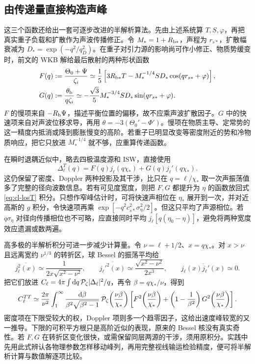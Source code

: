 \subsection{由传递量直接构造声峰}\label{sec:cosmo-form-factors}

这三个函数还给出一套可逐步改进的半解析算法。先由上述系统算 $T,S,\varphi$，再把真实重子负载和扩散作为声波传播修正。令 $M_*=1+R_{{\rm b}*}$，声程为 $r_{s*}$，扩散幅衰减为 $D_*=\exp(-q^2/q_D^2)$。在重子对引力源的影响尚可作小修正、物质势缓变时，前文的 WKB 解给最后散射的两种形状函数
\begin{align*}
 F(q)&:=\frac{\Theta_0+\Psi}{\zeta_i}
  \simeq\frac15\left[3R_{{\rm b}*}T
       -M_*^{-1/4}S D_*
                       \cos(qr_{s*}+\varphi)\right],\\
 G(q)&:=\frac{\theta_{\rm b}}{q\zeta_i}
  \simeq-\frac{\sqrt3}{5}M_*^{-3/4}S D_*
                       \sin(qr_{s*}+\varphi).
\end{align*}
$F$ 的慢项来自 $-R_{\rm b}\Psi$，描述平衡位置的偏移，故不应乘声波扩散因子。$G$ 中的快速项来自对声波位移求导，再用 $\theta=-3(\Theta_0'-\Phi')$。慢项在物质主导、定常势的这一精度内抵消或降到膨胀慢变的高阶。若重子已明显改变等密度附近的势和冷物质响应，把它只放进 $M_*^{-1/4}$ 就不够，应重算传递函数。

在瞬时退耦近似中，略去四极温度源和 ISW，直接使用
\[
 \Delta_\ell^T(q)=F(q)j_\ell(q\chi_*)+
                      G(q)j_\ell'(q\chi_*).
\]
这仍保留了密度、Doppler 两种投影及其干涉，比只在 $q=\ell/\chi_*$ 取一次声振荡值多了完整的径向波数信息。若有可见度宽度，则把 $F,G$ 都提升为 $\eta$ 的函数放回式 \eqref{eq:cl-losT} 积分。只想作窄峰估计时，可将快速声相位在 $\eta_*$ 展开到一次，并对近高斯的 $g$ 积分，令快速项再乘 $\exp[-q^2c_{s*}^2\sigma_\eta^2/2]$。但这只平均了声源相位。若 $q\sigma_\eta$ 对径向传播相位也不可略，应直接同时平均 $j_\ell[q(\eta_0-\eta)]$，避免将两种宽度效应遗漏或数两遍。

高多极的半解析积分可进一步减少计算量。令 $\nu=\ell+1/2$、$x=q\chi_*$。对 $x>\nu$ 且远离宽约 $\nu^{1/3}$ 的转折区，球 Bessel 的振荡平均给
\[
 \overline{j_\ell^2(x)}\simeq
       \frac{1}{2x\sqrt{x^2-\nu^2}},\qquad
 \overline{j_\ell'^2(x)}\simeq
       \frac{\sqrt{x^2-\nu^2}}{2x^3},\qquad
 \overline{j_\ell(x)j_\ell'(x)}\simeq0 .
\]
把它们放进 $C_\ell=4\pi\int\dd q\,\mathcal P_\zeta|\Delta_\ell|^2/q$，再令 $\beta=q\chi_*/\nu$，得到
\[
 C_\ell^{TT}\simeq\frac{2\pi}{\nu^2}
 \int_1^\infty\frac{\dd\beta}{\beta^2\sqrt{\beta^2-1}}\,
  \mathcal P_\zeta\!\left(\frac{\nu\beta}{\chi_*}\right)
 \left[
 F^2\!\left(\frac{\nu\beta}{\chi_*}\right)
  +\left(1-\frac1{\beta^2}\right)
       G^2\!\left(\frac{\nu\beta}{\chi_*}\right)
 \right].
\]
密度项在下限受较大的权，Doppler 项则多一个趋零因子，这给出速度峰较宽的又一推导。下限的可积平方根只是高阶近似的表现，原来的 Bessel 核没有真实奇性。若 $F,G$ 在转折区变化很快，或需保留同层两源的干涉，须用原积分。实践中先用此式辨认各物理参数怎样移动峰列，再用完整视线输运检验精度，便可将半解析计算与数值解逐项比较。

